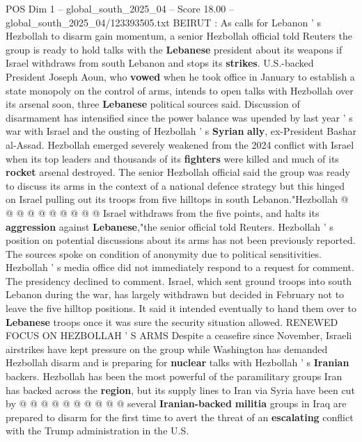 \begin{textsample}{POS Dim 1 – global\_south\_2025\_04 – Score 18.00 – global\_south\_2025\_04/123393505.txt}  \label{ex:f1_pos_322}
BEIRUT : As calls for Lebanon ' s Hezbollah to disarm gain momentum, a senior Hezbollah official told Reuters the group is ready to hold talks with the \textbf{Lebanese} president about its weapons if Israel withdraws from south Lebanon and stops its \textbf{strikes}.
U.S.-backed President Joseph Aoun, who \textbf{vowed} when he took office in January to establish a state monopoly on the control of arms, intends to open talks with Hezbollah over its arsenal soon, three \textbf{Lebanese} political sources said.
Discussion of disarmament has intensified since the power balance was upended by last year ' s war with Israel and the ousting of Hezbollah ' s \textbf{Syrian} \textbf{ally}, ex-President Bashar al-Assad.
Hezbollah emerged severely weakened from the 2024 conflict with Israel when its top leaders and thousands of its \textbf{fighters} were killed and much of its \textbf{rocket} arsenal destroyed.
The senior Hezbollah official said the group was ready to discuss its arms in the context of a national defence strategy but this hinged on Israel pulling out its troops from five hilltops in south Lebanon."Hezbollah @ @ @ @ @ @ @ @ @ @ Israel withdraws from the five points, and halts its \textbf{aggression} against \textbf{Lebanese},"the senior official told Reuters.
Hezbollah ' s position on potential discussions about its arms has not been previously reported.
The sources spoke on condition of anonymity due to political sensitivities.
Hezbollah ' s media office did not immediately respond to a request for comment.
The presidency declined to comment.
Israel, which sent ground troops into south Lebanon during the war, has largely withdrawn but decided in February not to leave the five hilltop positions.
It said it intended eventually to hand them over to \textbf{Lebanese} troops once it was sure the security situation allowed.
RENEWED FOCUS ON HEZBOLLAH ' S ARMS Despite a ceasefire since November, Israeli airstrikes have kept pressure on the group while Washington has demanded Hezbollah disarm and is preparing for \textbf{nuclear} talks with Hezbollah ' s \textbf{Iranian} backers.
Hezbollah has been the most powerful of the paramilitary groups Iran has backed across the \textbf{region}, but its supply lines to Iran via Syria have been cut by @ @ @ @ @ @ @ @ @ @ several \textbf{Iranian-backed} \textbf{militia} groups in Iraq are prepared to disarm for the first time to avert the threat of an \textbf{escalating} conflict with the Trump administration in the U.S.

\end{textsample}
